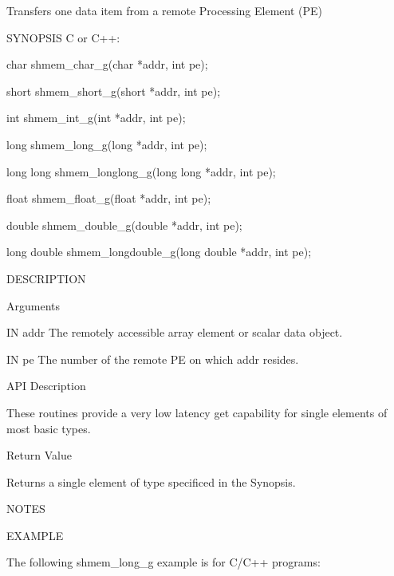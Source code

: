        Transfers one data item from a remote Processing Element (PE)

SYNOPSIS
       C or C++:

	  char shmem_char_g(char *addr, int pe);

	  short shmem_short_g(short *addr, int pe);

	  int shmem_int_g(int *addr, int pe);

	  long shmem_long_g(long *addr, int pe);

	  long long  shmem_longlong_g(long long *addr, int pe);

	  float shmem_float_g(float *addr, int pe);

	  double shmem_double_g(double *addr, int pe);

	  long double shmem_longdouble_g(long double *addr, int pe);

DESCRIPTION

Arguments

	IN       addr   The remotely accessible array element or scalar data object.

       IN	pe     The number of the remote PE on which addr resides.

API Description

       These  routines	provide	 a  very low latency get capability for single
       elements of most basic types.

Return Value

	Returns a single element of type specificed in the Synopsis.

NOTES

EXAMPLE

	The following shmem_long_g example is for C/C++ programs:

       



